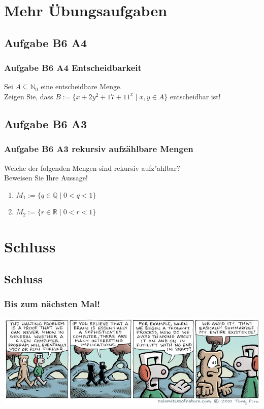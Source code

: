 \section{Mehr Übungsaufgaben}
\subsection{Aufgabe B6 A4}
\begin{frame}
	\frametitle{Aufgabe B6 A4 Entscheidbarkeit}
	Sei $A \subseteq \mathbb{N}_0$ eine entscheidbare Menge. \\
	Zeigen Sie, dass $ B := \{x+2y^2+17+11^x \; | \; x,y \in A\}$ entscheidbar ist!
\end{frame}
\subsection{Aufgabe B6 A3}
\begin{frame}
	\frametitle{Aufgabe B6 A3 rekursiv aufzählbare Mengen}
	Welche der folgenden Mengen sind rekursiv aufz"ahlbar? \\
	Beweisen Sie Ihre Aussage!
	\begin{enumerate}
		\item $M_1 := \{q \in \mathbb{Q} \; | \; 0<q<1\}$
		\item $M_2 := \{r \in \mathbb{R} \; | \; 0<r<1\}$
	\end{enumerate}
\end{frame}

\section{Schluss}
\subsection{Schluss}
\begin{frame}
\frametitle{Bis zum nächsten Mal!}
\begin{center}
  \includegraphics[width=1.59 \textheight]{images/halting.jpg}
\end{center}
\end{frame}

